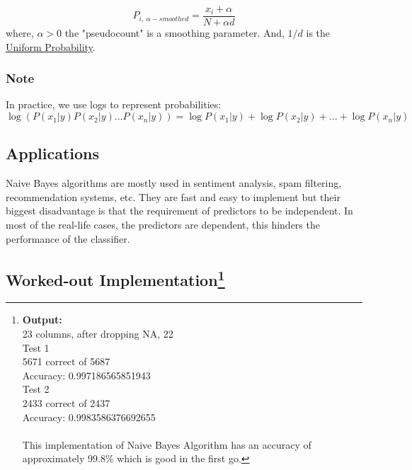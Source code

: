     \begin{equation}
        P_{i,\ \alpha-smoothed} = \frac{x_i+\alpha}{N+\alpha d}
    \end{equation}
    where, $\alpha > 0$ the "pseudocount" is a smoothing parameter. And, $1/d$ is the \href{https://en.wikipedia.org/wiki/Discrete_uniform_distribution}{Uniform Probability}.

    \subsubsection{Note}
    In practice, we use logs to represent probabilities:
    \begin{equation}
        \log{(P(x_1|y)P(x_2|y)...P(x_n|y))} = \log{P(x_1|y)} + \log{P(x_2|y)} +...+ \log{P(x_n|y)}
    \end{equation}


\subsection{Applications}
    Naive Bayes algorithms are mostly used in sentiment analysis, spam filtering, recommendation systems, etc. They are fast and easy to implement but their biggest disadvantage is that the requirement of predictors to be independent. In most of the real-life cases, the predictors are dependent, this hinders the performance of the classifier.

\subsection*{Worked-out Implementation\footnote[2]{ \textbf{Output:}\\
23 columns, after dropping NA, 22\\
Test 1\\
5671 correct of 5687\\
Accuracy: 0.997186565851943\\
Test 2\\
2433 correct of 2437\\
Accuracy: 0.9983586376692655\\ 
\\This implementation of Naive Bayes Algorithm has an accuracy of approximately 99.8\% which is good in the first go.}}

